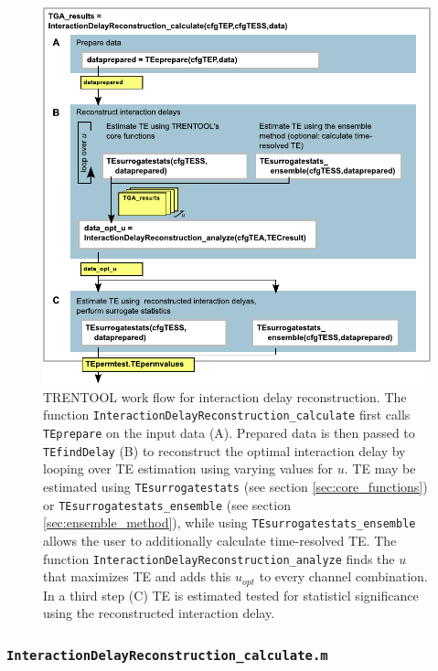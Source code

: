 \documentclass[a4paper,10pt]{article}
\begin{document}
\begin{figure}[H]	
	\centering	
 		\includegraphics[scale=0.90]{figures/TRENTOOL3_workflow_delayreconstruction.pdf}
	\caption[TRENTOOL work flow for interaction delay reconstruction]{TRENTOOL work flow for interaction delay reconstruction. The function \texttt{InteractionDelayReconstruction\_calculate} first calls \texttt{TEprepare} on the input data (A). Prepared data is then passed to \texttt{TEfindDelay} (B) to reconstruct the optimal interaction delay by looping over TE estimation using varying values for $u$. TE may be estimated using \texttt{TEsurrogatestats} (see section \ref{sec:core_functions}) or \texttt{TEsurrogatestats\_ensemble} (see section \ref{sec:ensemble_method}), while using \texttt{TEsurrogatestats\_ensemble} allows the user to additionally calculate time-resolved TE. The function \texttt{InteractionDelayReconstruction\_analyze} finds the $u$ that maximizes TE and adds this $u_{opt}$ to every channel combination. In a third step (C) TE is estimated tested for statisticl significance using the reconstructed interaction delay.	
	}
	\label{fig:workflow_delayReconstruction}
\end{figure} 

\subsubsection{\texttt{InteractionDelayReconstruction\_calculate.m}} 
\end{document}

